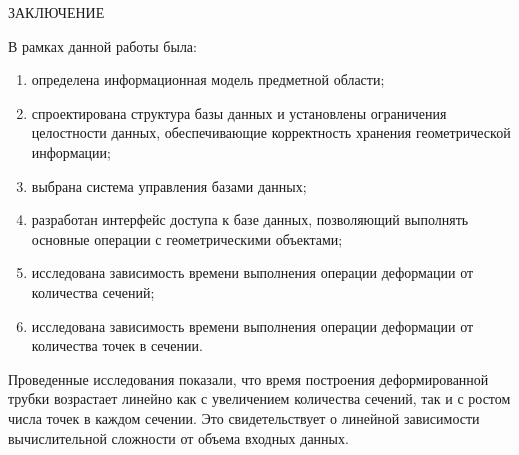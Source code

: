 \begin{center}
    \MakeUppercase{\large ЗАКЛЮЧЕНИЕ}
\end{center}

\noindent
\hspace{1.25cm}
В рамках данной работы была:

\begin{enumerate}

\item определена информационная модель предметной области;

\item спроектирована структура базы данных и установлены ограничения целостности данных, обеспечивающие корректность хранения геометрической информации;

\item выбрана система управления базами данных;

\item разработан интерфейс доступа к базе данных, позволяющий выполнять основные операции с геометрическими объектами;

\item исследована зависимость времени выполнения операции деформации от количества сечений;

\item исследована зависимость времени выполнения операции деформации от количества точек в сечении.


\end{enumerate}

\noindent
\hspace{1.25cm}
Проведенные исследования показали, что время построения деформированной трубки возрастает линейно как с увеличением количества сечений, так и с ростом числа точек в каждом сечении. Это свидетельствует о линейной зависимости вычислительной сложности от объема входных данных.
